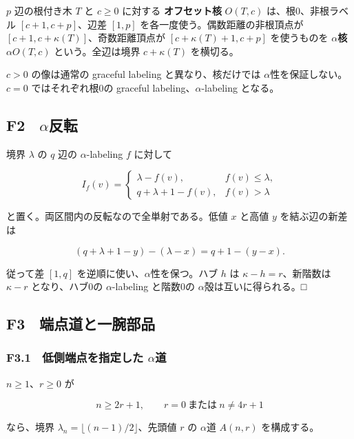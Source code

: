 \documentclass[
  10pt,
  a4paper,
]{article}
\begin{document}
\(p\) 辺の根付き木 \(T\) と \(c\ge0\) に対する \textbf{オフセット核}
\(O(T,c)\) は、根0、非根ラベル \([c+1,c+p]\)、辺差 \([1,p]\)
を各一度使う。偶数距離の非根頂点が \([c+1,c+\kappa(T)]\)、奇数距離頂点が
\([c+\kappa(T)+1,c+p]\) を使うものを \textbf{\(\alpha\)核}
\(\alpha O(T,c)\) という。全辺は境界 \(c+\kappa(T)\) を横切る。

\(c>0\) の像は通常の graceful labeling と異なり、核だけでは
\(\alpha\)性を保証しない。\(c=0\) ではそれぞれ根0の graceful
labeling、\(\alpha\)-labeling となる。

\subsection{\texorpdfstring{F2　\(\alpha\)反転}{F2　\textbackslash alpha反転}}\label{f2-alphaux53cdux8ee2}

境界 \(\lambda\) の \(q\) 辺の \(\alpha\)-labeling \(f\) に対して

\[
I_f(v)=
\begin{cases}
\lambda-f(v),&f(v)\le\lambda,\\
q+\lambda+1-f(v),&f(v)>\lambda
\end{cases}
\]

と置く。両区間内の反転なので全単射である。低値 \(x\) と高値 \(y\)
を結ぶ辺の新差は

\[
(q+\lambda+1-y)-(\lambda-x)=q+1-(y-x).
\]

従って差 \([1,q]\) を逆順に使い、\(\alpha\)性を保つ。ハブ \(h\) は
\(\kappa-h=r\)、新階数は \(\kappa-r\) となり、ハブ0の
\(\alpha\)-labeling と階数0の \(\alpha\)殻は互いに得られる。□

\subsection{F3　端点道と一腕部品}\label{f3-ux7aefux70b9ux9053ux3068ux4e00ux8155ux90e8ux54c1}

\subsubsection{\texorpdfstring{F3.1　低側端点を指定した
\(\alpha\)道}{F3.1　低側端点を指定した \textbackslash alpha道}}\label{f3.1-ux4f4eux5074ux7aefux70b9ux3092ux6307ux5b9aux3057ux305f-alphaux9053}

\(n\ge1\)、\(r\ge0\) が

\[
n\ge2r+1,\qquad r=0\ \text{または}\ n\ne4r+1
\tag{F3.1}
\]

なら、境界 \(\lambda_n=\lfloor(n-1)/2\rfloor\)、先頭値 \(r\) の
\(\alpha\)道 \(A(n,r)\) を構成する。
\end{document}
